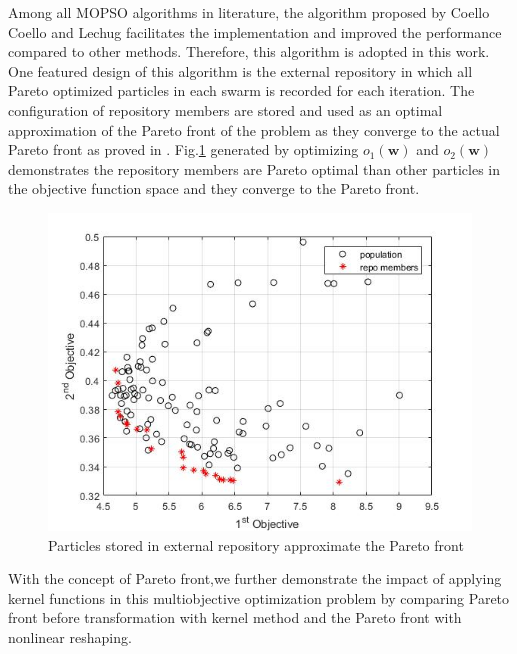 Among all MOPSO algorithms in literature, the algorithm proposed by Coello Coello and Lechug facilitates the implementation and improved the performance compared to other methods\cite{coello2002mopso}. Therefore,  this algorithm is adopted in this work. One featured design of this algorithm is the external repository in which all Pareto optimized particles in each swarm is recorded for each iteration. The configuration of repository members are stored and used as an optimal approximation of the Pareto front of the problem as they converge to the actual Pareto front as proved in \cite{coello2002mopso}. Fig.\ref{fig:repo_members} generated by optimizing $o_1(\mathbf{w}) $ and $o_2(\mathbf{w})$ demonstrates the repository members are Pareto optimal than other particles in the objective function space and they converge to the Pareto front.

\begin{figure}[t]
\centering
\includegraphics[scale=.6]{Fig/repo_members.jpg}
\caption{Particles stored in external repository approximate the Pareto front}
\label{fig:repo_members}
\end{figure}

With the concept of Pareto front,we further demonstrate the impact of applying kernel functions in this multiobjective optimization problem by comparing Pareto front before transformation with kernel method and the Pareto front with nonlinear reshaping. %


